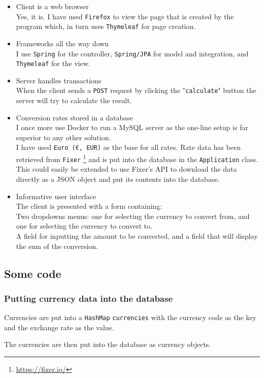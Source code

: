 \documentclass[a4paper]{scrartcl}
\begin{document}
\begin{itemize}
{{		}
	}
	\item{
		Client is a web browser\\
		Yes, it is. I have used \texttt{Firefox} to view the page that is created by the program which, in turn uses \texttt{Thymeleaf} for page creation.
	}
	\item{
		Frameworks all the way down\\
		I use \texttt{Spring} for the controller, \texttt{Spring/JPA} for model and integration, and \texttt{Thymeleaf} for the view.
	}
	\item{
		Server handles transactions\\
		When the client sends a \texttt{POST} request by clicking the "\texttt{calculate}" button the server will try to calculate the result.
	}
	\item{
		Conversion rates stored in a database\\
		I once more use Docker to run a MySQL server as the one-line setup is far superior to any other solution.\\
		I have used \texttt{Euro (\euro{}, EUR)} as the base for all rates. Rate data has been retrieved from \texttt{Fixer} \footnote{\url{https://fixer.io/}} and is put into the database in the \texttt{Application} class.\\
		This could easily be extended to use Fixer's API to download the data directly as a JSON object and put its contents into the database.
	}
	\item{
		Informative user interface\\
		The client is presented with a form containing:\\
		Two dropdowns menus: one for selecting the currency to convert from, and one for selecting the currency to convert to.\\
		A field for inputting the amount to be converted, and a field that will display the sum of the conversion.
	}
\end{itemize}

\subsection{Some code}
\subsubsection{Putting currency data into the database}
Currencies are put into a \texttt{HashMap} \texttt{currencies} with the currency code as the key and the exchange rate as the value.

The currencies are then put into the database as currency objects.

\end{document}

